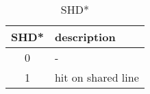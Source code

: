 %
%
\begin{table}[htbp]
\caption{SHD*}\label{tbl:shd}
   \begin{center}
   \begin{tabular}{|c|l|} \hline
      SHD* & description \\ \hline \hline
      0    & - \\ \hline
      1    & hit on shared line \\ \hline
   \end{tabular}
   \end{center}
\end{table}
%
%
